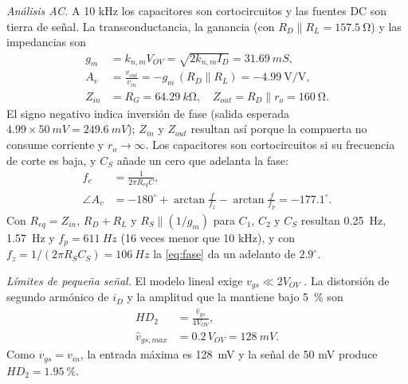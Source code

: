 \documentclass[conference]{IEEEtran}
\newcommand{\gm}{g_m}
\newcommand{\Vov}{V_{OV}}
\newcommand{\knm}{k_{n,m}}
\begin{document}
\noindent\textit{Análisis AC.} A 10 kHz los capacitores son cortocircuitos y las fuentes DC son tierra de señal. La transconductancia, la ganancia (con $R_D\parallel R_L=\SI{157.5}{\ohm}$) y las impedancias son
\begin{align}
\gm&=\knm\Vov=\sqrt{2\knm I_D}=\SI{31.69}{mS},\label{eq:gm}\\
A_v&=\frac{v_{out}}{v_{in}}=-\gm\,(R_D\parallel R_L)=-4.99\ \text{V/V},\label{eq:Av}\\
Z_{in}&=R_{G}=\SI{64.29}{k\ohm},\quad Z_{out}=R_D\parallel r_o=\SI{160}{\ohm}.\label{eq:zin_zout}
\end{align}
El signo negativo indica inversión de fase (salida esperada $4.99\times\SI{50}{mV}=\SI{249.6}{mV}$); $Z_{in}$ y $Z_{out}$ resultan así porque la compuerta no consume corriente y $r_o\rightarrow\infty$. Los capacitores son cortocircuitos si su frecuencia de corte es baja, y $C_S$ añade un cero que adelanta la fase:
\begin{align}
f_c&=\frac{1}{2\pi R_{eq}C},\label{eq:fc}\\
\angle A_v&=-180^\circ+\arctan\frac{f}{f_z}-\arctan\frac{f}{f_p}=-177.1^\circ.\label{eq:fase}
\end{align}
Con $R_{eq}=Z_{in}$, $R_D+R_L$ y $R_S\parallel(1/\gm)$ para $C_1$, $C_2$ y $C_S$ resultan \SI{0.25}{Hz}, \SI{1.57}{Hz} y $f_p=\SI{611}{Hz}$ (16 veces menor que 10 kHz), y con $f_z=1/(2\pi R_SC_S)=\SI{106}{Hz}$ la \eqref{eq:fase} da un adelanto de $2.9^\circ$.

\noindent\textit{Límites de pequeña señal.} El modelo lineal exige $v_{gs}\ll 2\Vov$ \cite{sedra}. La distorsión de segundo armónico de $i_D$ y la amplitud que la mantiene bajo \SI{5}{\percent} son
\begin{align}
HD_2&=\frac{\hat v_{gs}}{4\Vov},\label{eq:hd2}\\
\hat v_{gs,max}&=0.2\,\Vov=\SI{128}{mV}.\label{eq:limite}
\end{align}
Como $v_{gs}=v_{in}$, la entrada máxima es \SI{128}{mV} y la señal de 50 mV produce $HD_2=\SI{1.95}{\percent}$.
\end{document}
